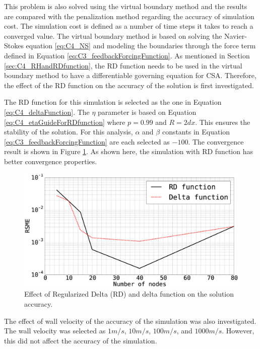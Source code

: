 This problem is also solved using the virtual boundary method and the results are compared with the penalization method regarding the accuracy of simulation cost. The simulation cost is defined as a number of time steps it takes to reach a converged value. The virtual boundary method is based on solving the Navier-Stokes equation \eqref{eq:C4_NS} and modeling the boundaries through the force term defined in Equation \eqref{eq:C3_feedbackForcingFunction}. As mentioned in Section \ref{sec:C4_RHandRDfunction}, the RD function needs to be used in the virtual boundary method to have a differentiable governing equation for CSA. Therefore, the effect of the RD function on the accuracy of the solution is first investigated.

The RD function for this simulation is selected as the one in Equation \eqref{eq:C4_deltaFunction}. The $\eta$ parameter is based on Equation \eqref{eq:C4_etaGuideForRDfunction} where $p = 0.99$ and $R = 2dx$. This ensures the stability of the solution. For this analysis, $\alpha$ and $\beta$ constants in Equation \eqref{eq:C3_feedbackForcingFunction} are each selected as $-100$. The convergence result is shown in Figure \ref{fig:C4_virtualBoundary_RDvsD}. As shown here, the simulation with RD function has better convergence properties.

\begin{figure}[H]
    \centering
    \includegraphics[width=12.00cm]{Chapter_4/figure/effect_of_RD_on_simulation_vs_numberOfNodes_1D_problem.eps}
    \caption{Effect of Regularized Delta (RD) and delta function on the solution accuracy.}
    \label{fig:C4_virtualBoundary_RDvsD}
\end{figure}

The effect of wall velocity of the accuracy of the simulation was also investigated. The wall velocity was selected as $1 m/s$, $10 m/s$, $100 m/s$, and $1000 m/s$. However, this did not affect the accuracy of the simulation.

